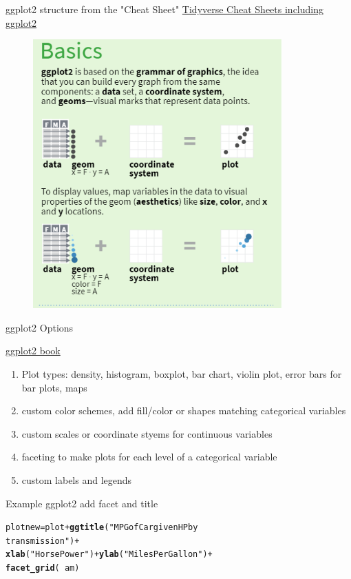 \documentclass{beamer}\usepackage[]{graphicx}\usepackage[]{color}
\makeatletter
\newcommand{\hlstr}[1]{\textcolor[rgb]{0.192,0.494,0.8}{#1}}%
\newcommand{\hlopt}[1]{\textcolor[rgb]{0,0,0}{#1}}%
\newcommand{\hlstd}[1]{\textcolor[rgb]{0.345,0.345,0.345}{#1}}%
\newcommand{\hlkwb}[1]{\textcolor[rgb]{0.69,0.353,0.396}{#1}}%
\newcommand{\hlkwd}[1]{\textcolor[rgb]{0.737,0.353,0.396}{\textbf{#1}}}%
\newenvironment{kframe}{%
 \def\at@end@of@kframe{}%
 \ifinner\ifhmode%
  \def\at@end@of@kframe{\end{minipage}}%
  \begin{minipage}{\columnwidth}%
 \fi\fi%
 \def\FrameCommand##1{\hskip\@totalleftmargin \hskip-\fboxsep
 \colorbox{shadecolor}{##1}\hskip-\fboxsep
     \hskip-\linewidth \hskip-\@totalleftmargin \hskip\columnwidth}%
 \MakeFramed {\advance\hsize-\width
   \@totalleftmargin\z@ \linewidth\hsize
   \@setminipage}}%
 {\par\unskip\endMakeFramed%
 \at@end@of@kframe}
\newenvironment{knitrout}{}{} %
\makeatother
\begin{document}
\begin{frame}{ggplot2 structure from the "Cheat Sheet"}
\href{https://www.rstudio.com/resources/cheatsheets/}{Tidyverse Cheat Sheets including ggplot2}
\begin{figure}
  \includegraphics[height=0.75\textheight]{ggplot2cheatsheetbasic.png}
\end{figure}
\end{frame}

\begin{frame}{ggplot2 Options}

\href{https://ggplot2-book.org/}{ggplot2 book}
\begin{enumerate}
\item Plot types:  density, histogram, boxplot, bar chart, violin plot, error bars for bar plots, maps
\item custom color schemes, add fill/color or shapes matching categorical variables
\item custom scales or coordinate styems for continuous variables
\item faceting to make plots for each level of a categorical variable
\item custom labels and legends
\end{enumerate}

\end{frame}

\begin{frame}[fragile]{Example ggplot2 add facet and title}
\begin{knitrout}
\color{fgcolor}\begin{kframe}
\begin{alltt}
\hlstd{plotnew} \hlkwb{=} \hlstd{plot} \hlopt{+} \hlkwd{ggtitle}\hlstd{(}\hlstr{"MPG of Car given HP by
                         transmission"}\hlstd{)} \hlopt{+}
    \hlkwd{xlab}\hlstd{(}\hlstr{"Horse Power"}\hlstd{)} \hlopt{+} \hlkwd{ylab}\hlstd{(}\hlstr{"Miles Per Gallon"}\hlstd{)} \hlopt{+}
    \hlkwd{facet_grid}\hlstd{(}\hlopt{~}\hlstd{am)}
\end{alltt}
\end{kframe}
\end{knitrout}
\end{frame}
\end{document}

